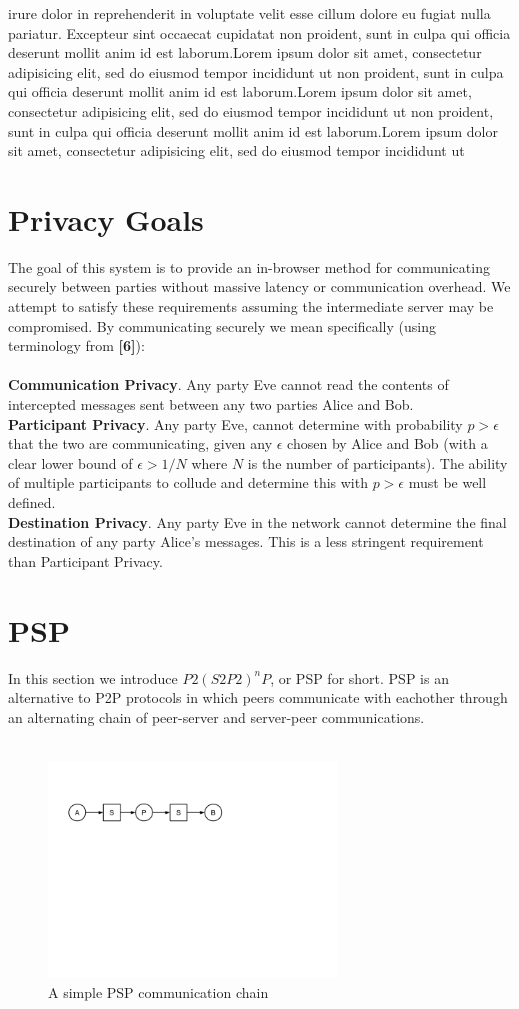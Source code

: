 \documentclass{paper}
\begin{document}
irure dolor in reprehenderit in voluptate velit esse cillum dolore eu fugiat nulla pariatur. Excepteur sint occaecat cupidatat non proident, sunt in culpa qui officia deserunt mollit anim id est laborum.Lorem ipsum dolor sit amet, consectetur adipisicing elit, sed do eiusmod tempor incididunt ut non proident, sunt in culpa qui officia deserunt mollit anim id est laborum.Lorem ipsum dolor sit amet, consectetur adipisicing elit, sed do eiusmod tempor incididunt ut non proident, sunt in culpa qui officia deserunt mollit anim id est laborum.Lorem ipsum dolor sit amet, consectetur adipisicing elit, sed do eiusmod tempor incididunt ut
\section{Privacy Goals}
  The goal of this system is to provide an in-browser method for communicating securely between parties without massive latency or communication overhead. We attempt to satisfy these requirements assuming the intermediate server may be compromised. By communicating securely we mean specifically (using terminology from \textbf{[6]}):
  \\\\\textbf{Communication Privacy}. Any party Eve cannot read the contents of intercepted messages sent between any two parties Alice and Bob. 
  \\\textbf{Participant Privacy}. Any party Eve, cannot determine with probability $p > \epsilon$ that the two are communicating, given any $\epsilon$ chosen by Alice and Bob (with a clear lower bound of $\epsilon > 1/N$ where $N$ is the number of participants). The ability of multiple participants to collude and determine this with $p > \epsilon$ must be well defined.
  \\\textbf{Destination Privacy}. Any party Eve in the network cannot determine the final destination of any party Alice's messages. This is a less stringent requirement than Participant Privacy.
\section{PSP}
In this section we introduce
$P2(S2P2)^nP$, or PSP for short. PSP is an alternative to P2P protocols in which peers communicate with eachother through an alternating chain of peer-server and server-peer communications.
\\\\
\begin{figure}[ht]
  \includegraphics[width=290px]{PSP.png}
  \caption{A simple PSP communication chain}
\end{figure}
\\\\
\end{document}
